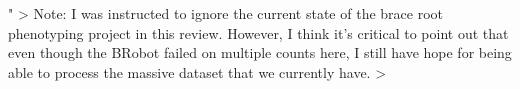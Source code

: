 \documentclass[11pt]{article}
\begin{document}
" \textgreater{} Note: I was instructed to ignore the current state of
the brace root phenotyping project in this review. However, I think it's
critical to point out that even though the BRobot failed on multiple
counts here, I still have hope for being able to process the massive
dataset that we currently have. \textgreater{}


    
    
    
\end{document}
